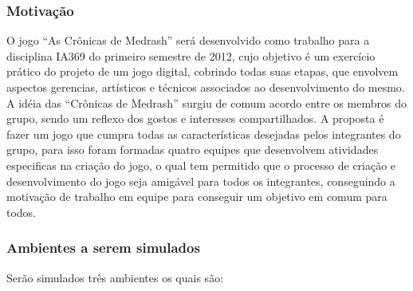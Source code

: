 \begin{itemize}


\end{itemize}

\subsubsection{Motivação}

O jogo ``As Crônicas de Medrash'' será desenvolvido como trabalho para
 a disciplina IA369 do primeiro semestre de 2012, cujo objetivo é um exercício 
prático do projeto de um jogo digital, cobrindo todas suas etapas, que envolvem 
aspectos gerencias, artísticos e técnicos associados ao desenvolvimento do mesmo.
A idéia das ``Crônicas de Medrash'' surgiu de comum acordo entre os membros
 do grupo, sendo um reflexo dos gostos e interesses compartilhados. A proposta 
é fazer um jogo que cumpra todas as características desejadas pelos integrantes 
do grupo, para isso foram formadas quatro equipes que desenvolvem atividades 
especificas na criação do jogo, o qual tem permitido que o processo de criação e 
desenvolvimento do jogo seja amigável para todos os integrantes, conseguindo 
a motivação de trabalho em equipe para conseguir um objetivo em comum para todos.

\subsubsection{Ambientes a serem simulados}
Serão simulados três ambientes os quais são:

